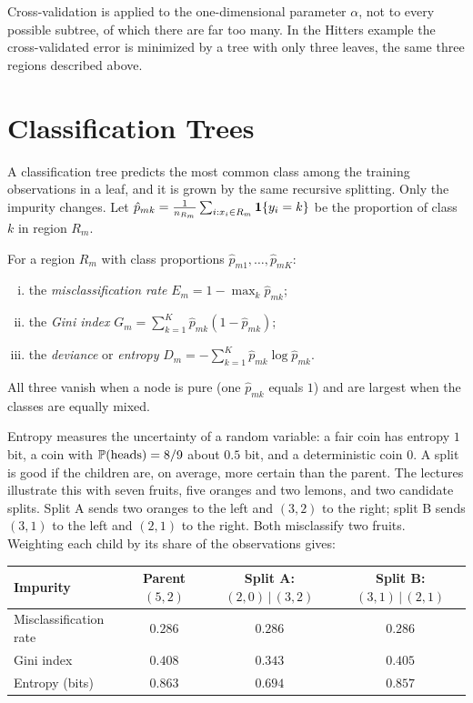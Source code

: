 Cross-validation is applied to the one-dimensional parameter $\alpha$, not to every possible subtree, of which there are far too many. In the Hitters example the cross-validated error is minimized by a tree with only three leaves, the same three regions described above.

\section{Classification Trees}\label{sec:classification-trees}

A classification tree predicts the most common class among the training observations in a leaf, and it is grown by the same recursive splitting. Only the impurity changes. Let $\hat p_{mk}=\frac1{n_{R_m}}\sum_{i:x_i\in R_m}\mathbf{1}\{y_i=k\}$ be the proportion of class $k$ in region $R_m$.

\begin{definition}\label{def:impurity}
For a region $R_m$ with class proportions $\hat p_{m1},\dots,\hat p_{mK}$:
\begin{enumerate}[(i)]
  \item the \emph{misclassification rate} $E_m=1-\max_k\hat p_{mk}$;
  \item the \emph{Gini index} $G_m=\sum_{k=1}^K\hat p_{mk}(1-\hat p_{mk})$;
  \item the \emph{deviance} or \emph{entropy} $D_m=-\sum_{k=1}^K\hat p_{mk}\log\hat p_{mk}$.
\end{enumerate}
All three vanish when a node is pure (one $\hat p_{mk}$ equals $1$) and are largest when the classes are equally mixed.
\end{definition}

Entropy measures the uncertainty of a random variable: a fair coin has entropy $1$ bit, a coin with $\mathbb{P}(\text{heads})=8/9$ about $0.5$ bit, and a deterministic coin $0$. A split is good if the children are, on average, more certain than the parent. The lectures illustrate this with seven fruits, five oranges and two lemons, and two candidate splits. Split A sends two oranges to the left and $(3,2)$ to the right; split B sends $(3,1)$ to the left and $(2,1)$ to the right. Both misclassify two fruits. Weighting each child by its share of the observations gives:

\begin{center}
\small
\begin{tabular}{@{}lccc@{}}
\toprule
Impurity & Parent $(5,2)$ & Split A: $(2,0)\,|\,(3,2)$ & Split B: $(3,1)\,|\,(2,1)$ \\
\midrule
Misclassification rate & $0.286$ & $0.286$ & $0.286$ \\
Gini index & $0.408$ & $0.343$ & $0.405$ \\
Entropy (bits) & $0.863$ & $0.694$ & $0.857$ \\
\bottomrule
\end{tabular}
\end{center}


